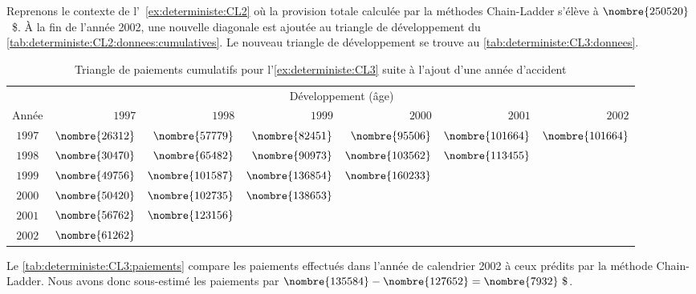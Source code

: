 \begin{exemple}
  \label{ex:deterministe:CL3}
  Reprenons le contexte de l'~\autoref{ex:deterministe:CL2} où la
  provision totale calculée par la méthodes Chain-Ladder s'élève à
  $\nombre{250520}$~\$. À la fin de l'année 2002, une nouvelle
  diagonale est ajoutée au triangle de développement du
  \autoref{tab:deterministe:CL2:donnees:cumulatives}. Le nouveau
  triangle de développement se trouve au
  \autoref{tab:deterministe:CL3:donnees}.

  \begin{table}
    \centering
    \caption{Triangle de paiements cumulatifs pour
      l'\autoref{ex:deterministe:CL3} suite à l'ajout d'une année
      d'accident}
    \label{tab:deterministe:CL3:donnees}
    \begin{tabular}{crrrrrr}
      \toprule
      & \multicolumn{6}{c}{Développement (âge)} \\
      Année & $1997$ & $1998$ & $1999$ & $2000$ & $2001$ & $2002$ \\
      \midrule
      $1997$ & $\nombre{26312}$ & $\nombre{57779}$  & $\nombre{82451}$ & $\nombre{95506}$ & $\nombre{101664}$ & $\nombre{101664}$ \\
      $1998$ & $\nombre{30470}$ & $\nombre{65482}$  & $\nombre{90973}$ & $\nombre{103562}$ & $\nombre{113455}$ \\
      $1999$ & $\nombre{49756}$ & $\nombre{101587}$ & $\nombre{136854}$	& $\nombre{160233}$ \\
      $2000$ & $\nombre{50420}$ & $\nombre{102735}$ & $\nombre{138653}$ \\
      $2001$ & $\nombre{56762}$ & $\nombre{123156}$ \\
      $2002$ & $\nombre{61262}$ \\
      \bottomrule
    \end{tabular}
  \end{table}

  Le \autoref{tab:deterministe:CL3:paiements} compare les paiements
  effectués dans l'année de calendrier 2002 à ceux prédits par la
  méthode Chain-Ladder. Nous avons donc sous-estimé les paiements par
  $\nombre{135584} - \nombre{127652} = \nombre{7932}~\$$.


\end{exemple}
